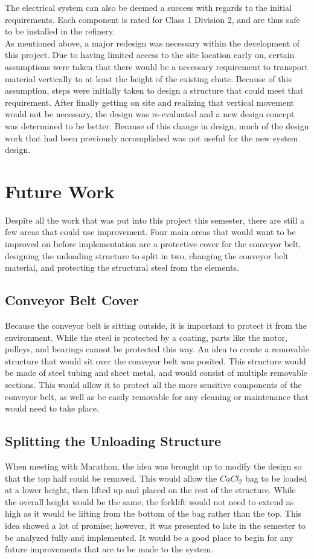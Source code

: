\documentclass[10pt]{project}
\begin{document}
The electrical system can also be deemed a success with regards to the initial requirements.  Each component is rated for Class 1 Division 2, and are thus safe to be installed in the refinery.\\
As mentioned above, a major redesign was necessary within the development of this project.  Due to having limited access to the site location early on, certain assumptions were taken that there would be a necessary requirement to transport material vertically to at least the height of the existing chute.  Because of this assumption, steps were initially taken to design a structure that could meet that requirement.  After finally getting on site and realizing that vertical movement would not be necessary, the design was re-evaluated and a new design concept was determined to be better.  Because of this change in design, much of the design work that had been previously accomplished was not useful for the new system design.

\section{Future Work}\label{sec:future}
Despite all the work that was put into this project this semester, there are still a few areas that could use improvement.  Four main areas that would want to be improved on before implementation are a protective cover for the conveyor belt, designing the unloading structure to split in two, changing the conveyor belt material, and protecting the structural steel from the elements.
\subsection{Conveyor Belt Cover}
Because the conveyor belt is sitting outside, it is important to protect it from the environment.  While the steel is protected by a coating, parts like the motor, pulleys, and bearings cannot be protected this way.  An idea to create a removable structure that would sit over the conveyor belt was posited.  This structure would be made of steel tubing and sheet metal, and would consist of multiple removable sections.  This would allow it to protect all the more sensitive components of the conveyor belt, as well as be easily removable for any cleaning or maintenance that would need to take place.
\subsection{Splitting the Unloading Structure}
When meeting with Marathon, the idea was brought up to modify the design so that the top half could be removed.  This would allow the $CaCl_2$ bag to be loaded at a lower height, then lifted up and placed on the rest of the structure.  While the overall height would be the same, the forklift would not need to extend as high as it would be lifting from the bottom of the bag rather than the top.  This idea showed a lot of promise; however, it was presented to late in the semester to be analyzed fully and implemented.  It would be a good place to begin for any future improvements that are to be made to the system.
\end{document}
